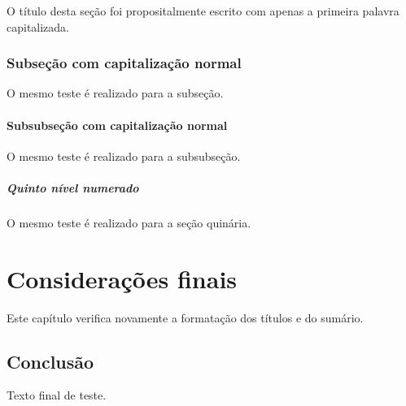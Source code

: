 O título desta seção foi propositalmente escrito com apenas a primeira
palavra capitalizada.

\subsection{Subseção com capitalização normal}

O mesmo teste é realizado para a subseção.

\subsubsection{Subsubseção com capitalização normal}

O mesmo teste é realizado para a subsubseção.

\paragraph{Quinto nível numerado}

O mesmo teste é realizado para a seção quinária.

\chapter{Considerações finais}

Este capítulo verifica novamente a formatação dos títulos e do sumário.

\section{Conclusão}

Texto final de teste.






